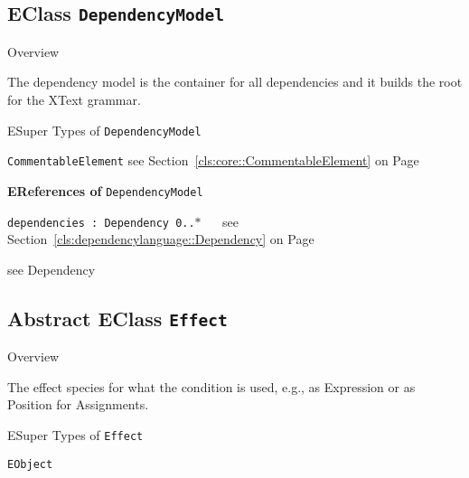 \subsection{EClass \bfseries \texttt{DependencyModel}\normalfont}
\label{cls:dependencylanguage::DependencyModel} 
	
	\begin{longdescription}
		\item[Overview] 		
				

	

		The dependency model is the container for all dependencies and it builds the root for the XText grammar.		
		\item[ESuper Types of \texttt{DependencyModel}] ~
			\begin{longdescription}
				\item[\texttt{CommentableElement}] see Section~\ref{cls:core::CommentableElement} on Page~\pageref{cls:core::CommentableElement}						\end{longdescription}
		
	
			\item[\textbf{EReferences of} \texttt{DependencyModel}] ~
			\begin{longdescription}
	\item[\texttt{dependencies : Dependency \symbol{"5B}0..$*$\symbol{"5D}
}] ~
	see Section~\ref{cls:dependencylanguage::Dependency} on Page~\pageref{cls:dependencylanguage::Dependency}
	
	\nopagebreak
		
				

	

		  see Dependency		
			\end{longdescription}
	
	\end{longdescription}
	

\subsection{Abstract EClass \bfseries \texttt{Effect}\normalfont}
\label{cls:dependencylanguage::Effect} 
	
	\begin{longdescription}
		\item[Overview] 		
				

	

		The effect species for what the condition is used, e.g.,
as Expression or as Position for Assignments.		
		\item[ESuper Types of \texttt{Effect}] ~
			\begin{longdescription}
				\item[\texttt{EObject}] 						\end{longdescription}
		
	
	
	\end{longdescription}
	

